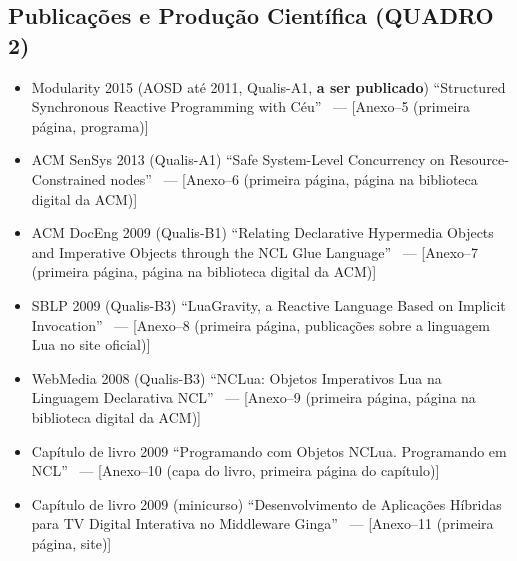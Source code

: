 \documentclass[12pt,a4paper]{article}
\begin{document}
\subsection*{Publicações e Produção Científica (QUADRO 2)}


\begin{itemize}

\item Modularity 2015 (AOSD até 2011, Qualis-A1, \textbf{a ser publicado})
``Structured Synchronous Reactive Programming with Céu''~\cite{ceu.mod15}
--- [Anexo--5 (primeira página, programa)]

\item ACM SenSys 2013 (Qualis-A1)
``Safe System-Level Concurrency on Resource-Constrained 
nodes''~\cite{ceu.sensys13}
--- [Anexo--6 (primeira página, página na biblioteca digital da ACM)]

\item ACM DocEng 2009 (Qualis-B1)
``Relating Declarative Hypermedia Objects and Imperative Objects through the 
NCL Glue Language''~\cite{nclua.doceng}
--- [Anexo--7 (primeira página, página na biblioteca digital da ACM)]

\item SBLP 2009 (Qualis-B3)
``LuaGravity, a Reactive Language Based on Implicit 
Invocation''~\cite{luagravity.sblp}
--- [Anexo--8 (primeira página, publicações sobre a linguagem Lua no site 
oficial)]

\item WebMedia 2008 (Qualis-B3)
``NCLua: Objetos Imperativos Lua na Linguagem Declarativa 
NCL''~\cite{nclua.webmedia}
--- [Anexo--9 (primeira página, página na biblioteca digital da ACM)]

\item Capítulo de livro 2009
``Programando com Objetos NCLua. Programando em NCL''~\cite{nclua.book}
--- [Anexo--10 (capa do livro, primeira página do capítulo)]

\item Capítulo de livro 2009 (minicurso)
``Desenvolvimento de Aplicações Híbridas para TV Digital Interativa no 
Middleware Ginga''~\cite{nclua.shortcourse}
--- [Anexo--11 (primeira página, site)]

\end{itemize}
\end{document}
